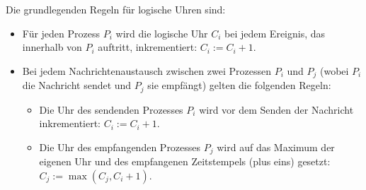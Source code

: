 \documentclass[../vs-script-first-v01.tex]{subfiles}
\begin{document}
Die grundlegenden Regeln für logische Uhren sind:
\begin{itemize}
\item Für jeden Prozess $P_i$ wird die logische Uhr $C_i$ bei jedem Ereignis, das innerhalb von $P_i$ auftritt, inkrementiert: $C_i := C_i + 1$.
\item Bei jedem Nachrichtenaustausch zwischen zwei Prozessen $P_i$ und $P_j$ (wobei $P_i$ die Nachricht sendet und $P_j$ sie empfängt) gelten die folgenden Regeln:
\begin{itemize}
\item Die Uhr des sendenden Prozesses $P_i$ wird vor dem Senden der Nachricht inkrementiert: $C_i := C_i + 1$.
\item Die Uhr des empfangenden Prozesses $P_j$ wird auf das Maximum der eigenen Uhr und des empfangenen Zeitstempels (plus eins) gesetzt: $C_j := \max(C_j, C_i + 1)$.
\end{itemize}    
\end{itemize}
\end{document}
